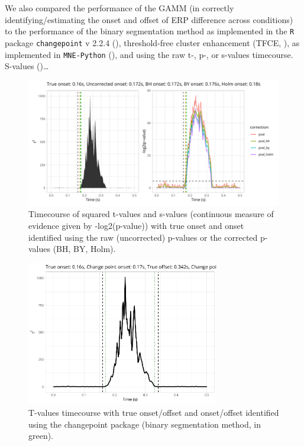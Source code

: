 \documentclass[
  doc,
  floatsintext,
  longtable,
  a4paper,
  nolmodern,
  notxfonts,
  notimes,
  colorlinks=true,linkcolor=blue,citecolor=blue,urlcolor=blue]{apa7}
\begin{document}
We also compared the performance of the GAMM (in correctly
identifying/estimating the onset and offset of ERP difference across
conditions) to the performance of the binary segmentation method as
implemented in the \texttt{R} package \texttt{changepoint} v 2.2.4
(), threshold-free
cluster enhancement (TFCE, ), as implemented in \texttt{MNE-Python}
(), and using the raw t-, p-,
or s-values timecourse. S-values
()\ldots{}

\begin{figure}[H]

\caption{Timecourse of squared t-values and s-values (continuous measure
of evidence given by -log2(p-value)) with true onset and onset
identified using the raw (uncorrected) p-values or the corrected
p-values (BH, BY, Holm).}

{\centering \includegraphics[width=1\textwidth,height=\textheight]{brms_meeg_files/figure-pdf/test-1d-1.pdf}

}

\end{figure}%

\begin{figure}[H]

\caption{T-values timecourse with true onset/offset and onset/offset
identified using the changepoint package (binary segmentation method, in
green).}

{\centering \includegraphics[width=0.75\textwidth,height=\textheight]{brms_meeg_files/figure-pdf/changepoint-1.pdf}

}

\end{figure}%
\end{document}
